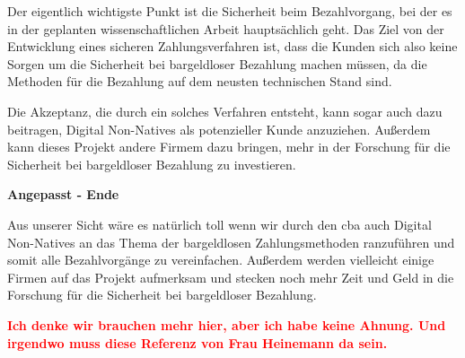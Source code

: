 Der eigentlich wichtigste Punkt ist die Sicherheit beim Bezahlvorgang, bei der es in der geplanten wissenschaftlichen Arbeit 
hauptsächlich geht. Das Ziel von der Entwicklung eines sicheren Zahlungsverfahren ist, dass die Kunden sich also keine Sorgen 
um die Sicherheit bei bargeldloser Bezahlung machen müssen, da die Methoden für die Bezahlung auf dem neusten technischen Stand sind.

Die Akzeptanz, die durch ein solches Verfahren entsteht, kann sogar auch dazu beitragen, Digital Non-Natives als potenzieller
Kunde anzuziehen. Außerdem kann dieses Projekt andere Firmem dazu bringen, mehr in der Forschung für die Sicherheit bei
bargeldloser Bezahlung zu investieren.



\textbf{Angepasst - Ende}


Aus unserer Sicht wäre es natürlich toll wenn wir durch den \acrfull{cba} auch Digital Non-Natives an das Thema der 
bargeldlosen Zahlungsmethoden ranzuführen und somit alle Bezahlvorgänge zu vereinfachen.
Außerdem werden vielleicht einige Firmen auf das Projekt aufmerksam und stecken noch mehr Zeit und Geld in die Forschung
für die Sicherheit bei bargeldloser Bezahlung.


\textcolor{red}{\textbf{Ich denke wir brauchen mehr hier, aber ich habe keine Ahnung. Und irgendwo muss diese Referenz
von Frau Heinemann da sein.}}


